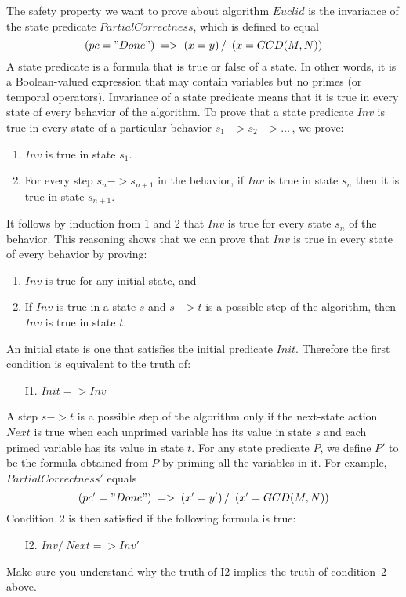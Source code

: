 The safety property we want to prove about algorithm $Euclid$ is the
invariance of the state predicate $PartialCorrectness$, which is defined
to equal
 \[ (pc = "Done") \;=>\; (x = y) \, /\ \, (x = GCD(M, N))
 \]
A 
state predicate is a formula that is true or false of a state.  In
other words, it is a Boolean-valued expression that may contain
variables but no primes (or temporal operators).  Invariance of a
state predicate means that it is true in every state of every behavior
of the algorithm.  To prove that a state predicate $Inv$ is true in
every state of a particular behavior
  $s_{1}->s_{2}-> \ldots$\,, 
we prove:
\begin{enumerate}
\item $Inv$ is true in state $s_{1}$.

\item For every step $s_{n}->s_{n+1}$ in the behavior, if $Inv$ is
true in state $s_{n}$ then it is true in state $s_{n+1}$.
\end{enumerate}
It follows by induction from 1 and 2 that $Inv$ is true for every
state $s_{n}$ of the behavior.  This reasoning shows that we
can prove that $Inv$ is true in every state of every behavior by
proving:
\begin{enumerate}
\item $Inv$ is true for any initial state, and

\item If $Inv$ is true in a state $s$ and $s->t$ is a possible step
of the algorithm, then $Inv$ is true in state $t$.
\end{enumerate}
An initial state is one that satisfies the initial predicate $Init$.
Therefore the first condition is equivalent to the truth of:
\begin{enumerate}
\item[I1.] $Init => Inv$
\end{enumerate}
A step $s -> t$ is a possible step of the algorithm only if the
next-state action $Next$ is true when each unprimed variable has its
value in state $s$ and each primed variable has its value in state
$t$.  For any state predicate $P$, we define $P'$ to be the formula
obtained from $P$ by priming all the variables in it.  For example,
$PartialCorrectness'$ equals
 \[ (pc' = "Done") \;=>\; (x' = y') \,/\ \,(x' = GCD(M, N))
 \]
Condition~2 is then satisfied if the following formula is true:
\begin{enumerate}
\item[I2.] 
$Inv /\ Next => Inv'$%
\end{enumerate}
Make sure you understand why the truth of I2 implies the truth of
condition~2 above.

